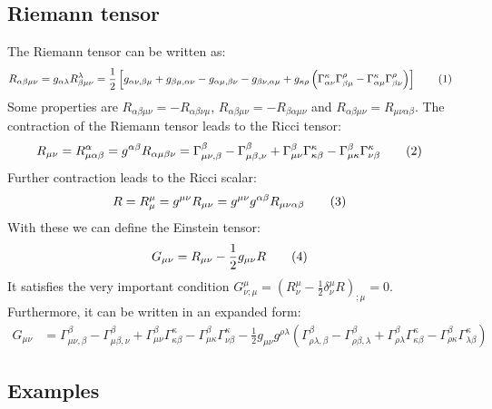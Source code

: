 \documentclass[a4paper,12pt]{article}
\newcommand\numberthis{\addtocounter{equation}{1}\tag{\theequation}}
\newcommand{\kla}{}
\newcommand{\klam}{}
\begin{document}
\subsection{Riemann tensor}
The Riemann tensor can be written as:
\begin{align*}
R_{\alpha\beta\mu\nu}&=g_{\alpha\lambda}R^\lambda_{\beta\mu\nu}=\frac{1}{2}\klam\left[ {g_{\alpha\nu,\beta\mu}+g_{\beta\mu,\alpha\nu}-g_{\alpha\mu,\beta\nu}-g_{\beta\nu,\alpha\mu}+g_{\kappa\rho}\kla\left( {\Gamma^\kappa_{\alpha\nu}\Gamma^\rho_{\beta\mu}-\Gamma^\kappa_{\alpha\mu}\Gamma^\rho_{\beta\nu}} \right)} \right]\numberthis\label{Riemann tensor definition}
\end{align*}
Some properties are $R_{\alpha\beta\mu\nu}=-R_{\alpha\beta\nu\mu}$, $R_{\alpha\beta\mu\nu}=-R_{\beta\alpha\mu\nu}$ and $R_{\alpha\beta\mu\nu}=R_{\mu\nu\alpha\beta}$. The contraction of the Riemann tensor leads to the Ricci tensor:
\begin{align*}
R_{\mu\nu}&=R^\alpha_{\mu\alpha\beta}=g^{\alpha\beta}R_{\alpha\mu\beta\nu}=\Gamma^\beta_{\mu\nu,\beta}-\Gamma^\beta_{\mu\beta,\nu}+\Gamma^\beta_{\mu\nu}\Gamma^\kappa_{\kappa\beta}-\Gamma^\beta_{\mu\kappa}\Gamma^\kappa_{\nu\beta}\numberthis\label{Ricci tensor definition}
\end{align*}
Further contraction leads to the Ricci scalar:
\begin{align*}
R&=R^\mu_\mu=g^{\mu\nu}R_{\mu\nu}=g^{\mu\nu}g^{\alpha\beta}R_{\mu\nu\alpha\beta}\numberthis\label{Ricci scalar definition}
\end{align*}
With these we can define the Einstein tensor:
\begin{align*}
G_{\mu\nu}&=R_{\mu\nu}-\frac{1}{2}g_{\mu\nu}R\numberthis\label{Einstein tensor definition}
\end{align*}
It satisfies the very important condition $G^\mu_{\nu;\mu}=\kla\left( {R^\mu_\nu-\frac{1}{2}\delta^\mu_\nu R} \right)_{;\mu}=0$. Furthermore, it can be written in an expanded form:
\begin{align*}
G_{\mu\nu}&=\Gamma^\beta_{\mu\nu,\beta}-\Gamma^\beta_{\mu\beta,\nu}+\Gamma^\beta_{\mu\nu}\Gamma^\kappa_{\kappa\beta}-\Gamma^\beta_{\mu\kappa}\Gamma^\kappa_{\nu\beta}-\frac{1}{2}g_{\mu\nu}g^{\rho\lambda}\kla\left( {\Gamma^\beta_{\rho\lambda,\beta}-\Gamma^\beta_{\rho\beta,\lambda}+\Gamma^\beta_{\rho\lambda}\Gamma^\kappa_{\kappa\beta}-\Gamma^\beta_{\rho\kappa}\Gamma^\kappa_{\lambda\beta}} \right)
\end{align*}
\subsection{Examples}
\end{document}
